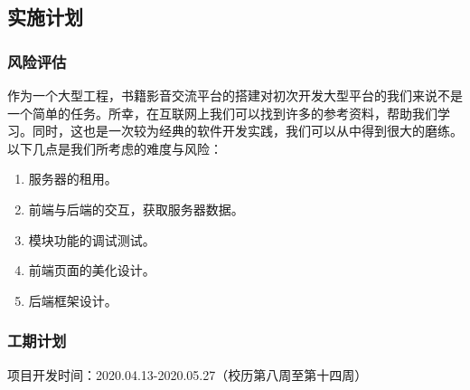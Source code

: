 \documentclass[
]{article}
\begin{document}
\hypertarget{header-n319}{%
\subsection{实施计划}\label{header-n319}}

\hypertarget{header-n320}{%
\subsubsection{风险评估}\label{header-n320}}

作为一个大型工程，书籍影音交流平台的搭建对初次开发大型平台的我们来说不是一个简单的任务。所幸，在互联网上我们可以找到许多的参考资料，帮助我们学习。同时，这也是一次较为经典的软件开发实践，我们可以从中得到很大的磨练。\\
以下几点是我们所考虑的难度与风险：

\begin{enumerate}
\def\labelenumi{\arabic{enumi}.}
\item
  服务器的租用。
\item
  前端与后端的交互，获取服务器数据。
\item
  模块功能的调试测试。
\item
  前端页面的美化设计。
\item
  后端框架设计。
\end{enumerate}

\hypertarget{header-n333}{%
\subsubsection{工期计划}\label{header-n333}}

项目开发时间：2020.04.13-2020.05.27（校历第八周至第十四周）
\end{document}
